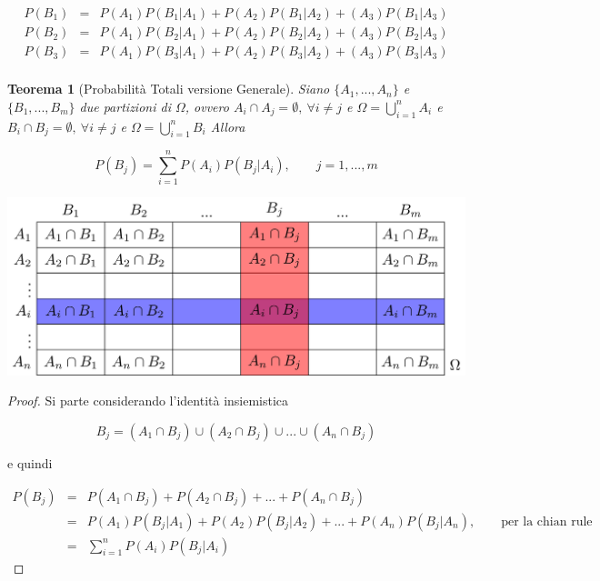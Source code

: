 \documentclass[
  11pt,
]{book}
\theoremstyle{mytheoremstyle}
\newtheorem{theorem}{Teorema}[section]
\theoremstyle{mydefstyle}
\begin{document}
\begin{eqnarray*}
P(B_1)&=&P(A_1)P(B_1|A_1)+P(A_2)P(B_1| A_2)+(A_3)P(B_1| A_3)\\
P(B_2)&=&P(A_1)P(B_2|A_1)+P(A_2)P(B_2| A_2)+(A_3)P(B_2| A_3)\\
P(B_3)&=&P(A_1)P(B_3|A_1)+P(A_2)P(B_3| A_2)+(A_3)P(B_3| A_3)\\
\end{eqnarray*}

\begin{info}

\begin{theorem}[Probabilità Totali versione Generale]
Siano \(\{A_1,...,A_n\}\) e \(\{B_1,...,B_m\}\) due partizioni di \(\Omega\), ovvero
\(A_i\cap A_j=\emptyset, ~\forall i\ne j\) e \(\Omega=\bigcup_{i=1}^n A_i\) e
\(B_i\cap B_j=\emptyset, ~\forall i\ne j\) e \(\Omega=\bigcup_{i=1}^n B_i\)
Allora

\[
P(B_j)=\sum_{i=1}^nP(A_i)P(B_j|A_i),\qquad j=1,...,m
\]
\end{theorem}

\end{info}

\begin{center}\includegraphics[width=41.67in,height=0.2\textheight,]{img/nxm} \end{center}

\begin{proof}
Si parte considerando l'identità insiemistica

\[
B_j = (A_1\cap B_j) \cup ( A_2 \cap B_j) \cup ... \cup ( A_n \cap B_j)
\]

e quindi

\begin{eqnarray*}
P(B_j)&=&P(A_1\cap B_j)+P( A_2\cap B_j)+...+P( A_n\cap B_j)\\
&=& P(A_1)P(B_j|A_1)+P(A_2)P(B_j|A_2)+...+P(A_n)P(B_j|A_n), \qquad \text{per la chian rule}\\
&=& \sum_{i=1}^nP(A_i)P(B_j|A_i)
\end{eqnarray*}
\end{proof}
\end{document}
